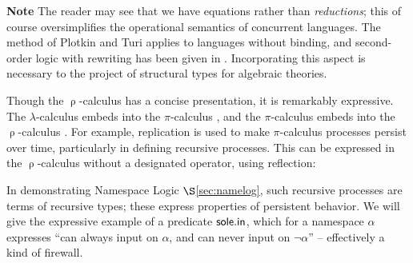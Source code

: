 \documentclass[stthol.tex]{subfiles}
\begin{document}


  \textbf{Note}\quad
  The reader may see that we have equations rather than \textit{reductions}; this of course oversimplifies the operational semantics of concurrent languages. The method of Plotkin and Turi \cite{opsem} applies to languages without binding, and second-order logic with rewriting has been given in \cite{hur}. Incorporating this aspect is necessary to the project of structural types for algebraic theories.

  \begin{example}
  Though the $\uprho$-calculus has a concise presentation, it is remarkably expressive. The $\lambda$-calculus embeds into the $\pi$-calculus \cite{polyadic}, and the $\pi$-calculus embeds into the $\uprho$-calculus \cite{rhocal}. For example, replication is used to make $\pi$-calculus processes persist over time, particularly in defining recursive processes. This can be expressed in the $\uprho$-calculus without a designated operator, using reflection:
\end{example}

In demonstrating Namespace Logic $\S$\ref{sec:namelog}, such recursive processes are terms of recursive types; these express properties of persistent behavior. We will give the expressive example of a predicate $\mathsf{sole.in}$, which for a namespace $\alpha$ expresses ``can always input on $\alpha$, and can never input on $\neg\alpha$'' -- effectively a kind of firewall.
\end{document}
